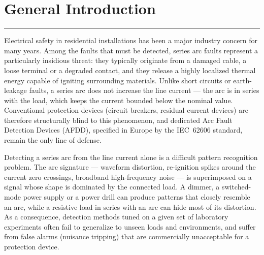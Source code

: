 \chapter*{General Introduction}

\noindent\rule{\linewidth}{1pt}
\vspace{0.3cm}

Electrical safety in residential installations has been a major industry concern for many years. Among the faults that must be detected, series arc faults represent a particularly insidious threat: they typically originate from a damaged cable, a loose terminal or a degraded contact, and they release a highly localized thermal energy capable of igniting surrounding materials. Unlike short circuits or earth-leakage faults, a series arc does not increase the line current --- the arc is in series with the load, which keeps the current bounded below the nominal value. Conventional protection devices (circuit breakers, residual current devices) are therefore structurally blind to this phenomenon, and dedicated Arc Fault Detection Devices (AFDD), specified in Europe by the IEC~62606 standard, remain the only line of defense.

\medskip

Detecting a series arc from the line current alone is a difficult pattern recognition problem. The arc signature --- waveform distortion, re-ignition spikes around the current zero crossings, broadband high-frequency noise --- is superimposed on a signal whose shape is dominated by the connected load. A dimmer, a switched-mode power supply or a power drill can produce patterns that closely resemble an arc, while a resistive load in series with an arc can hide most of its distortion. As a consequence, detection methods tuned on a given set of laboratory experiments often fail to generalize to unseen loads and environments, and suffer from false alarms (nuisance tripping) that are commercially unacceptable for a protection device.

\medskip

